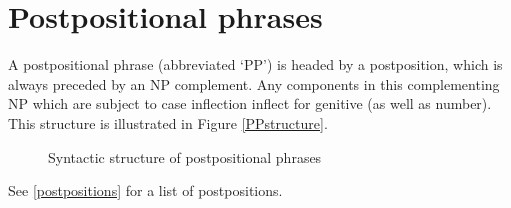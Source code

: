 \section{Postpositional phrases}\label{postpositionalPhrases}
A postpositional phrase (abbreviated ‘PP’) is headed by a postposition, which is always preceded by an NP complement. Any components in this complementing NP which are subject to case inflection inflect for genitive (as well as number). This structure is illustrated in Figure \vref{PPstructure}. 
\begin{figure}[h]
\caption{Syntactic structure of postpositional phrases}\label{PPstructure}
\end{figure}
See \SEC\vref{postpositions} for a list of postpositions. 

